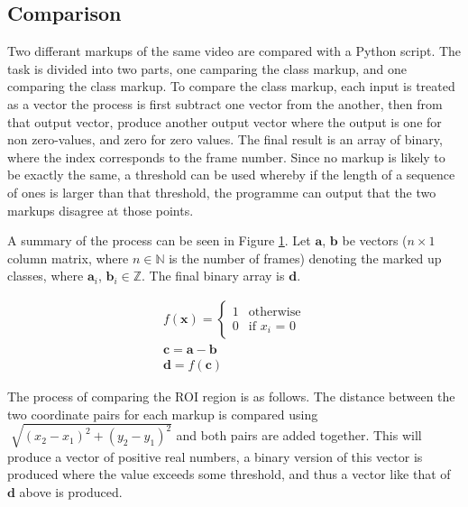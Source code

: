    \subsection{Comparison}
    Two differant markups of the same video are compared with a Python script. The task is divided into two parts, one camparing the class markup, and one comparing the class markup.  To compare the class markup, each input is treated as a vector the process is first subtract one vector from the another, then from that output vector, produce another output vector where the output is one for non zero-values, and zero for zero values. The final result is an array of binary, where the index corresponds to the frame number. Since no markup is likely to be exactly the same, a threshold can be used whereby if the length of a sequence of ones is larger than that threshold, the programme can output that the two markups disagree at those points.
    
    A summary of the process can be seen in Figure \ref{fig:classprocessing}. Let $\pmb{a}$, $\pmb{b}$ be vectors ($n \times 1$ column matrix, where $n \in \mathbb{N}$ is the number of frames) denoting the marked up classes, where $\pmb{a}_i$, $\pmb{b}_i \in \mathbb{Z}$. The final binary array is $\pmb{d}$.
    \begin{figure}[h]
        \centering
        \begin{gather*}
            f(\pmb{x})=
        \begin{cases}%
        1      & \text{otherwise}\\
        0      & \text{if $x_i$ = 0}
        \end{cases} \\
        \pmb{c}=\pmb{a}-\pmb{b} \\
        \pmb{d}=f(\pmb{c})
        \end{gather*}
        \caption{}
        \label{fig:classprocessing}
    \end{figure}

    The process of comparing the ROI region is as follows. The distance between the two coordinate pairs for each markup is compared using $\sqrt[]{{(x_2-x_1)}^2+{(y_2-y_1)}^2}$ and both pairs are added together. This will produce a vector of positive real numbers, a binary version of this vector is produced where the value exceeds some threshold, and thus a vector like that of $\pmb{d}$ above is produced.

